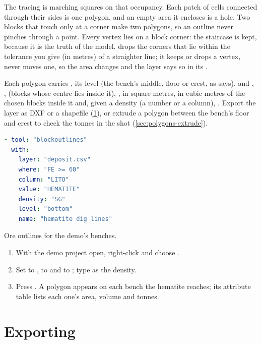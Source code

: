 The tracing is marching squares on that occupancy. Each patch of cells connected through their
sides is one polygon, and an empty area it encloses is a hole. Two blocks that touch only at a corner
make two polygons, so an outline never pinches through a point. Every vertex lies on a block corner:
the staircase is kept, because it is the truth of the model.  drops the corners that lie
within the tolerance you give (in metres) of a straighter line; it keeps or drops a vertex, never moves
one, so the area changes and the layer says so in its .

Each polygon carries , its level  (the bench's middle, floor or crest, as
 says),  and , ,  (blocks whose centre lies
inside it), ,  in square metres,  in cubic metres of the chosen blocks
inside it and, given a density (a number or a column), . Export the layer as DXF or a
shapefile (\cref{sec:polygons-export}), or extrude a polygon between the bench's floor and crest to
check the tonnes in the shot (\cref{sec:polygons-extrude}).

\begin{lstlisting}[language=yaml]
- tool: "blockoutlines"
  with:
    layer: "deposit.csv"
    where: "FE >= 60"
    column: "LITO"
    value: "HEMATITE"
    density: "SG"
    level: "bottom"
    name: "hematite dig lines"
\end{lstlisting}

\begin{tryit}
Ore outlines for the demo's benches.
\begin{enumerate}
\item With the demo project open, right-click  and choose
  .
\item Set  to ,  to  and  to
  ; type  as the density.
\item Press . A polygon appears on each bench the hematite reaches; its attribute table
  lists each one's area, volume and tonnes.
\end{enumerate}
\end{tryit}

\section{Exporting}\label{sec:polygons-export}

